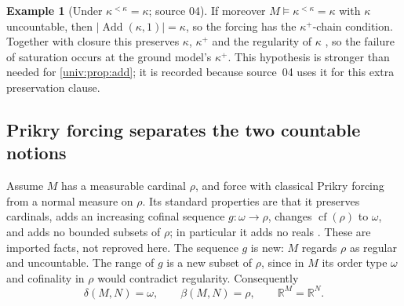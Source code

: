 \documentclass[11pt,letterpaper]{article}
\numberwithin{equation}{section}
\theoremstyle{definition}
\newtheorem{example}[example]{Example}
\theoremstyle{remark}
\newcommand{\R}{\mathbb R}
\newcommand{\cf}{\operatorname{cf}}
\newcommand{\Add}{\operatorname{Add}}
\newcommand{\abs}[1]{\lvert#1\rvert}
\begin{document}
\begin{example}[Under $\kappa^{<\kappa}=\kappa$; source 04]\label{univ:ex:addkappa}
If moreover $M\models\kappa^{<\kappa}=\kappa$ with $\kappa$ uncountable, then
$\abs{\Add(\kappa,1)}=\kappa$, so the forcing has the $\kappa^+$-chain
condition. Together with closure this preserves $\kappa$, $\kappa^+$ and the
regularity of $\kappa$ \cite{Jech}, so the failure of saturation occurs at the
ground model's $\kappa^+$. This hypothesis is stronger than needed for
\cref{univ:prop:add}; it is recorded because source~04 uses it for this extra
preservation clause.
\end{example}

\subsection{Prikry forcing separates the two countable notions}\label{univ:sub:prikry}

Assume $M$ has a measurable cardinal $\rho$, and force with classical Prikry
forcing from a normal measure on $\rho$. Its standard properties are that it
preserves cardinals, adds an increasing cofinal sequence $g:\omega\to\rho$,
changes $\cf(\rho)$ to $\omega$, and adds no bounded subsets of $\rho$; in
particular it adds no reals \cite{Prikry,Gitik,Benhamou}. These are imported
facts, not reproved here. The sequence $g$ is new: $M$ regards $\rho$ as
regular and uncountable. The range of $g$ is a new subset of $\rho$, since in
$M$ its order type $\omega$ and cofinality in $\rho$ would contradict regularity.
Consequently
\begin{equation}\label{univ:eq:prikry}
 \delta(M,N)=\omega,\qquad \beta(M,N)=\rho,\qquad \R^M=\R^N.
\end{equation}
\end{document}

